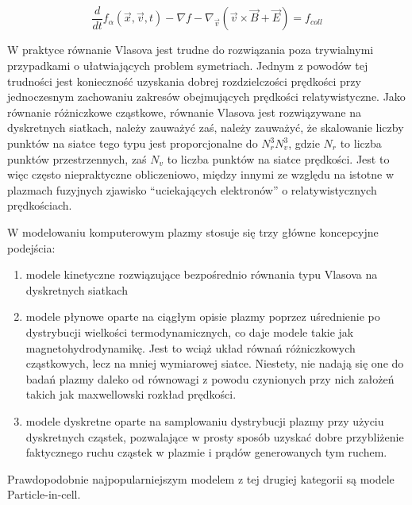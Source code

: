     \begin{equation}
        \frac{d} {dt} f_{\alpha} (\vec{x}, \vec{v}, t) - \nabla f - \nabla_{\vec{v}} (\vec{v} \times \vec{B} + \vec{E})= f_{coll}
        \label{eqn:Vlasov}
    \end{equation}

    W praktyce równanie Vlasova jest trudne do rozwiązania poza trywialnymi
    przypadkami o ułatwiających problem symetriach.  Jednym z powodów tej
    trudności jest konieczność uzyskania dobrej rozdzielczości prędkości przy
    jednoczesnym zachowaniu zakresów obejmujących prędkości relatywistyczne.
    Jako równanie różniczkowe cząstkowe, równanie Vlasova jest rozwiązywane na
    dyskretnych siatkach, należy zauważyć zaś, należy zauważyć, że skalowanie
    liczby punktów na siatce tego typu jest proporcjonalne do $N_r^3 N_v^3$,
    gdzie $N_r$ to liczba punktów przestrzennych, zaś $N_v$ to liczba punktów
    na siatce prędkości. Jest to więc często niepraktyczne obliczeniowo,
    między innymi ze względu na istotne w plazmach fuzyjnych zjawisko
    ``uciekających elektronów'' o relatywistycznych prędkościach.

    W modelowaniu komputerowym plazmy stosuje się trzy główne koncepcyjne podejścia:
    \begin{enumerate}
        \item modele kinetyczne rozwiązujące bezpośrednio równania typu Vlasova
            na dyskretnych siatkach
        \item modele płynowe oparte na ciągłym opisie plazmy poprzez
            uśrednienie po dystrybucji wielkości termodynamicznych, co daje
            modele takie jak magnetohydrodynamikę. Jest to wciąż układ równań
            różniczkowych cząstkowych, lecz na mniej wymiarowej siatce.
            Niestety, nie nadają się one do badań plazmy daleko od równowagi z
            powodu czynionych przy nich założeń takich jak maxwellowski rozkład
            prędkości.
        \item modele dyskretne oparte na samplowaniu dystrybucji plazmy przy
            użyciu dyskretnych cząstek, pozwalające w prosty sposób uzyskać
            dobre przybliżenie faktycznego ruchu cząstek w plazmie i prądów
            generowanych tym ruchem.
    \end{enumerate}

    Prawdopodobnie najpopularniejszym modelem z tej drugiej kategorii są modele
    Particle-in-cell.

